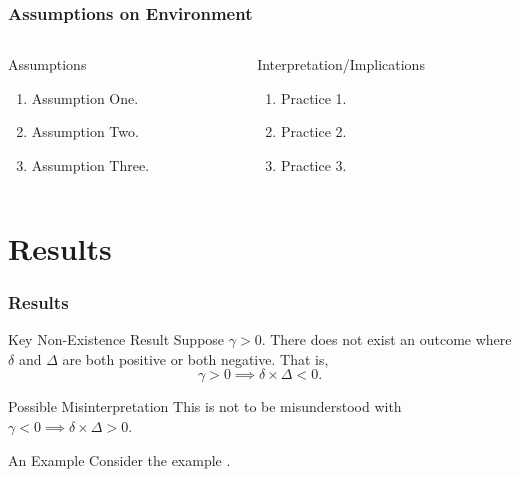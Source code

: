 \documentclass[10pt, mathserif, aspectratio = 169]{beamer}
\begin{document}
\begin{frame}
\frametitle{Assumptions on Environment}

\begin{columns}

\begin{column}{0.4\textwidth}
\begin{block}{Assumptions}
\begin{enumerate}
\item<1-> Assumption One. \vspace{2em}
\item<2-> Assumption Two. \vspace{2em}
\item<3-> Assumption Three. \vspace{2em}
\end{enumerate}
\end{block}
\end{column}

\begin{column}{0.5\textwidth}
\begin{block}{Interpretation/Implications}
\begin{enumerate}
\item<1-> Practice 1. \vspace{2em}
\item<2-> Practice 2. \vspace{2em}
\item<3-> Practice 3. \vspace{2em}
\end{enumerate}
\end{block}
\end{column}
\end{columns}
\end{frame}

\section{Results}

\begin{frame}
\frametitle{Results}
\pause
\begin{block}{Key Non-Existence Result}
Suppose $\gamma > 0$. There does not exist an outcome where $\delta$ and $\Delta$ are both positive or both negative. That is,
\begin{equation*}
\gamma > 0 \implies \delta \times \Delta < 0.
\end{equation*}
\end{block}

\pause

\begin{alertblock}{Possible Misinterpretation}
This is not to be misunderstood with $\gamma < 0 \implies \delta \times \Delta > 0$.
\end{alertblock}

\pause

\begin{exampleblock}{An Example}
Consider the example .
\end{exampleblock}
\end{frame}
\end{document}
